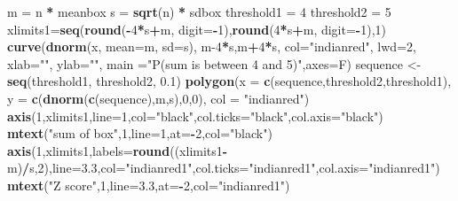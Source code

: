 \documentclass[]{article}
\newenvironment{Shaded}{\begin{snugshade}}{\end{snugshade}}
\newcommand{\DataTypeTok}[1]{\textcolor[rgb]{0.13,0.29,0.53}{#1}}
\newcommand{\DecValTok}[1]{\textcolor[rgb]{0.00,0.00,0.81}{#1}}
\newcommand{\FloatTok}[1]{\textcolor[rgb]{0.00,0.00,0.81}{#1}}
\newcommand{\KeywordTok}[1]{\textcolor[rgb]{0.13,0.29,0.53}{\textbf{#1}}}
\newcommand{\NormalTok}[1]{#1}
\newcommand{\OperatorTok}[1]{\textcolor[rgb]{0.81,0.36,0.00}{\textbf{#1}}}
\newcommand{\StringTok}[1]{\textcolor[rgb]{0.31,0.60,0.02}{#1}}
\begin{document}
\begin{Shaded}
\begin{Highlighting}[]
\NormalTok{m =}\StringTok{ }\NormalTok{n }\OperatorTok{*}\StringTok{ }\NormalTok{meanbox}
\NormalTok{s =}\StringTok{ }\KeywordTok{sqrt}\NormalTok{(n) }\OperatorTok{*}\StringTok{ }\NormalTok{sdbox}
\NormalTok{threshold1 =}\StringTok{ }\DecValTok{4}
\NormalTok{threshold2 =}\StringTok{ }\DecValTok{5}
\NormalTok{xlimits1=}\KeywordTok{seq}\NormalTok{(}\KeywordTok{round}\NormalTok{(}\OperatorTok{-}\DecValTok{4}\OperatorTok{*}\NormalTok{s}\OperatorTok{+}\NormalTok{m, }\DataTypeTok{digit=}\OperatorTok{-}\DecValTok{1}\NormalTok{),}\KeywordTok{round}\NormalTok{(}\DecValTok{4}\OperatorTok{*}\NormalTok{s}\OperatorTok{+}\NormalTok{m, }\DataTypeTok{digit=}\OperatorTok{-}\DecValTok{1}\NormalTok{),}\DecValTok{1}\NormalTok{)}
\KeywordTok{curve}\NormalTok{(}\KeywordTok{dnorm}\NormalTok{(x, }\DataTypeTok{mean=}\NormalTok{m, }\DataTypeTok{sd=}\NormalTok{s), m}\DecValTok{-4}\OperatorTok{*}\NormalTok{s,m}\OperatorTok{+}\DecValTok{4}\OperatorTok{*}\NormalTok{s, }\DataTypeTok{col=}\StringTok{"indianred"}\NormalTok{, }\DataTypeTok{lwd=}\DecValTok{2}\NormalTok{, }\DataTypeTok{xlab=}\StringTok{""}\NormalTok{, }\DataTypeTok{ylab=}\StringTok{""}\NormalTok{, }\DataTypeTok{main =}\StringTok{"P(sum is between 4 and 5)"}\NormalTok{,}\DataTypeTok{axes=}\NormalTok{F)}
\NormalTok{sequence <-}\StringTok{ }\KeywordTok{seq}\NormalTok{(threshold1, threshold2, }\FloatTok{0.1}\NormalTok{)}
\KeywordTok{polygon}\NormalTok{(}\DataTypeTok{x =} \KeywordTok{c}\NormalTok{(sequence,threshold2,threshold1),}
        \DataTypeTok{y =} \KeywordTok{c}\NormalTok{(}\KeywordTok{dnorm}\NormalTok{(}\KeywordTok{c}\NormalTok{(sequence),m,s),}\DecValTok{0}\NormalTok{,}\DecValTok{0}\NormalTok{),}
        \DataTypeTok{col =} \StringTok{"indianred"}\NormalTok{)}
\KeywordTok{axis}\NormalTok{(}\DecValTok{1}\NormalTok{,xlimits1,}\DataTypeTok{line=}\DecValTok{1}\NormalTok{,}\DataTypeTok{col=}\StringTok{"black"}\NormalTok{,}\DataTypeTok{col.ticks=}\StringTok{"black"}\NormalTok{,}\DataTypeTok{col.axis=}\StringTok{"black"}\NormalTok{)}
\KeywordTok{mtext}\NormalTok{(}\StringTok{"sum of box"}\NormalTok{,}\DecValTok{1}\NormalTok{,}\DataTypeTok{line=}\DecValTok{1}\NormalTok{,}\DataTypeTok{at=}\OperatorTok{-}\DecValTok{2}\NormalTok{,}\DataTypeTok{col=}\StringTok{"black"}\NormalTok{)}
\KeywordTok{axis}\NormalTok{(}\DecValTok{1}\NormalTok{,xlimits1,}\DataTypeTok{labels=}\KeywordTok{round}\NormalTok{((xlimits1}\OperatorTok{-}\NormalTok{m)}\OperatorTok{/}\NormalTok{s,}\DecValTok{2}\NormalTok{),}\DataTypeTok{line=}\FloatTok{3.3}\NormalTok{,}\DataTypeTok{col=}\StringTok{"indianred1"}\NormalTok{,}\DataTypeTok{col.ticks=}\StringTok{"indianred1"}\NormalTok{,}\DataTypeTok{col.axis=}\StringTok{"indianred1"}\NormalTok{)}
\KeywordTok{mtext}\NormalTok{(}\StringTok{"Z score"}\NormalTok{,}\DecValTok{1}\NormalTok{,}\DataTypeTok{line=}\FloatTok{3.3}\NormalTok{,}\DataTypeTok{at=}\OperatorTok{-}\DecValTok{2}\NormalTok{,}\DataTypeTok{col=}\StringTok{"indianred1"}\NormalTok{)}
\end{Highlighting}
\end{Shaded}
\end{document}
